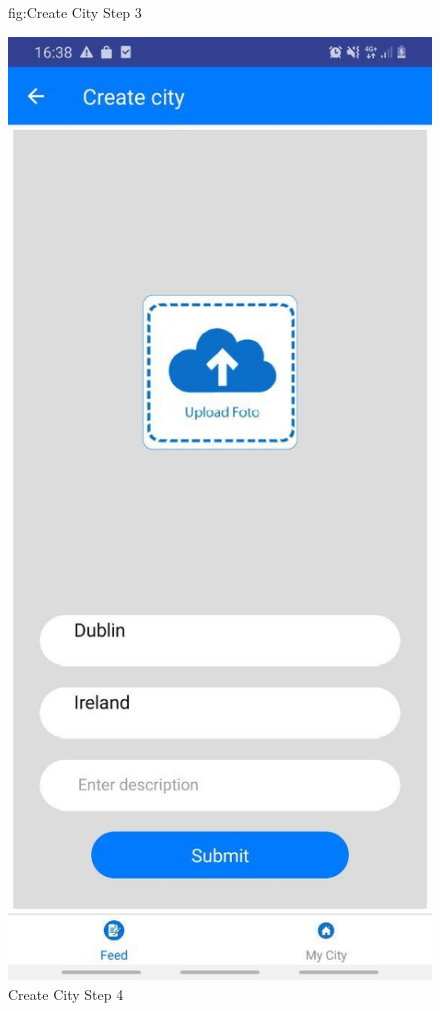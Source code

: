 \begin{figure}[h!]
\begin{minipage}[t]{0.48\textwidth}
\caption{fig:Create City Step 3}
\label{Create City3}
\end{minipage}
\hspace*{\fill} %
\begin{minipage}[t]{0.48\textwidth}
\includegraphics[width=\linewidth,keepaspectratio=true]{img/createCity.jpg}
\caption{Create City Step 4}
\label{fig:Create City4}
\end{minipage}
\end{figure}

